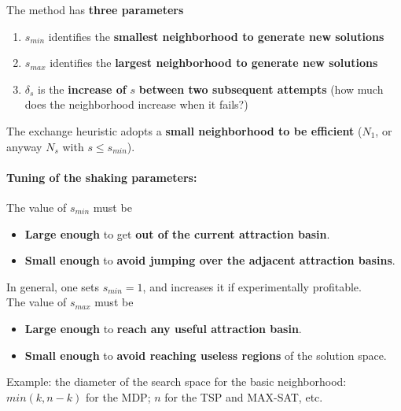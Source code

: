 \documentclass[11pt]{article}
\begin{document}
	
	The method has \textbf{three parameters}
	\begin{enumerate}
		\item $s_{min}$ identifies the \textbf{smallest neighborhood to generate new solutions}
		
		\item $s_{max}$ identifies the \textbf{largest neighborhood to generate new solutions}
		
		\item $\delta_s$ is the \textbf{increase of} $s$ \textbf{between two subsequent attempts} (how much does the neighborhood increase when it fails?)
	\end{enumerate}
	
	The exchange heuristic adopts a \textbf{small neighborhood to be efficient} ($N_1$, or anyway $N_s$ with $s \leq s_{min}$).\\
	
	\newpage
	
	\paragraph{Tuning of the shaking parameters:} The value of $s_{min}$ must be
	\begin{itemize}
		\item \textbf{Large enough} to get \textbf{out of the current attraction basin}.\\
		
		\item \textbf{Small enough} to \textbf{avoid jumping over the adjacent attraction basins}.\\
	\end{itemize}
	
	In general, one sets $s_{min} = 1$, and increases it if experimentally profitable.\\
	
	The value of $s_{max}$ must be
	\begin{itemize}
		\item \textbf{Large enough} to \textbf{reach any useful attraction basin}.\\
		
		\item \textbf{Small enough} to \textbf{avoid reaching useless regions} of the solution space.\\
	\end{itemize}
	Example: the diameter of the search space for the basic neighborhood: $min (k, n - k)$ for the MDP; $n$ for the TSP and MAX-SAT, etc.\\
	
\end{document}
